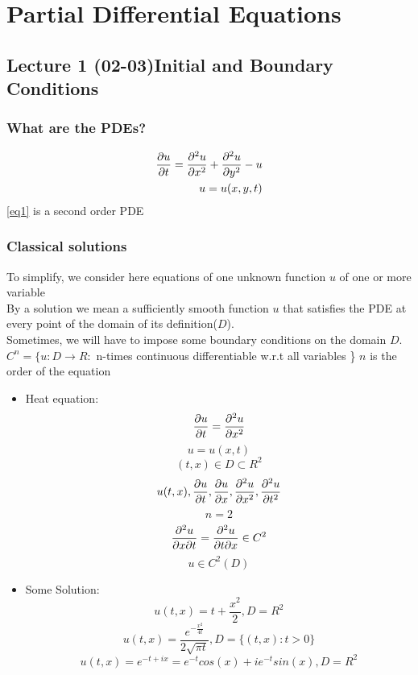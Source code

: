 \chapter[Partial Differential Equations]{Partial Differential Equations}

\section[Lecture 1 (02-03) -- {What are the PDEs?}]{Lecture 1 (02-03)Initial and Boundary Conditions}

\subsection{What are the PDEs?}
\begin{align}
    \label{eq1} \pdv{u}{t}=\pdv[2]{u}{x}+\pdv[2]{u}{y}-u 
    \\ u=u(x,y,t)
\end{align}
\eqref{eq1} is a second order PDE
 

\subsection{Classical solutions}
To simplify, we consider here equations of one unknown function $u$ of one or more variable
\\By a solution we mean a sufficiently smooth function $u$ that satisfies the PDE at every point of the domain of its definition($D$).
\\Sometimes, we will have to impose some boundary conditions on the domain $D$.
\\$C^n=\{u:D \rightarrow R:$ n-times continuous differentiable w.r.t all variables  \} $n$ is the order of the equation
\begin{example}{1}{}
    \begin{itemize}
        \item Heat equation: \[\pdv{u}{t}=\pdv[2]{u}{x}\]
        \[u=u(x,t)\]
        \[(t,x) \in D \subset R^2\]
        \[u(t,x), \pdv{u}{t}(t,x),\pdv{u}{x}(t,x),\pdv[2]{u}{x}(t,x),\pdv[2]{u}{t}(t,x)\]
        \[n=2\]
        \[\pdv{u}{x}{t}=\pdv{u}{t}{x} \in C^2\]
        \[u \in C^2(D)\]
        \item Some Solution:
        \[u(t,x)=t+\frac{x^2}{2},D=R^2\]
        \[u(t,x)=\frac{e^{-\frac{x^2}{4t}}}{2\sqrt{\pi t}},D=\{(t,x):t>0\}\]
        \[u(t,x)=e^{-t+ix}=e^{-t}cos(x)+ie^{-t}sin(x),D=R^2\]
    \end{itemize}
\end{example}
